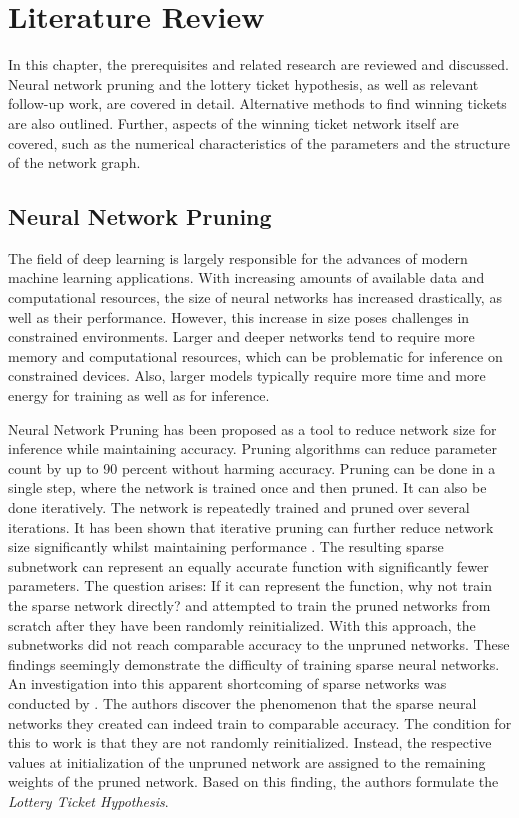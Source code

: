 \chapter{Literature Review}\label{literature_review}
In this chapter, the prerequisites and related research are reviewed and discussed.
Neural network pruning and the lottery ticket hypothesis, as well as relevant follow-up work, are covered in detail.
Alternative methods to find winning tickets are also outlined.
Further, aspects of the winning ticket network itself are covered, such as the numerical characteristics of the parameters and the structure of the network graph.

\section{Neural Network Pruning}
The field of deep learning is largely responsible for the advances of modern machine learning applications.
With increasing amounts of available data and computational resources, the size of neural networks has increased drastically, as well as their performance.
However, this increase in size poses challenges in constrained environments.
Larger and deeper networks tend to require more memory and computational resources, which can be problematic for inference on constrained devices.
Also, larger models typically require more time and more energy for training as well as for inference.

Neural Network Pruning \autocite{LeCun, OptimalBrainSurgeon, HanEtAl15, PruningFiltersForEfficientConvets} has been proposed as a tool to reduce network size for inference while maintaining accuracy.
Pruning algorithms can reduce parameter count by up to 90 percent without harming accuracy.
\autocite{LeCun, OptimalBrainSurgeon, HanEtAl15, PruningFiltersForEfficientConvets}
Pruning can be done in a single step, where the network is trained once and then pruned.
It can also be done iteratively. 
The network is repeatedly trained and pruned over several iterations. 
It has been shown that iterative pruning can further reduce network size significantly whilst maintaining performance \autocite{HanEtAl15}.
The resulting sparse subnetwork can represent an equally accurate function with significantly fewer parameters. 
The question arises: If it can represent the function, why not train the sparse network directly?
\textcite{HanEtAl15} and \textcite{PruningFiltersForEfficientConvets} attempted to train the pruned networks from scratch after they have been randomly reinitialized.
With this approach, the subnetworks did not reach comparable accuracy to the unpruned networks.
These findings seemingly demonstrate the difficulty of training sparse neural networks.
An investigation into this apparent shortcoming of sparse networks was conducted by \textcite{LTH}.
The authors discover the phenomenon that the sparse neural networks they created can indeed train to comparable accuracy.
The condition for this to work is that they are not randomly reinitialized. 
Instead, the respective values at initialization of the unpruned network are assigned to the remaining weights of the pruned network. 
Based on this finding, the authors formulate the \textit{Lottery Ticket Hypothesis}.

